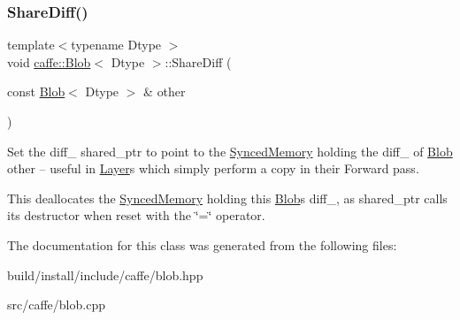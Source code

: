 \subsubsection{\texorpdfstring{Share\+Diff()}{ShareDiff()}\hspace{0.1cm}{\footnotesize\ttfamily [2/2]}}
{\footnotesize\ttfamily template$<$typename Dtype $>$ \\
void \mbox{\hyperlink{classcaffe_1_1_blob}{caffe\+::\+Blob}}$<$ Dtype $>$\+::Share\+Diff (\begin{DoxyParamCaption}\item[{const \mbox{\hyperlink{classcaffe_1_1_blob}{Blob}}$<$ Dtype $>$ \&}]{other }\end{DoxyParamCaption})}



Set the diff\+\_\+ shared\+\_\+ptr to point to the \mbox{\hyperlink{classcaffe_1_1_synced_memory}{Synced\+Memory}} holding the diff\+\_\+ of \mbox{\hyperlink{classcaffe_1_1_blob}{Blob}} other -- useful in \mbox{\hyperlink{classcaffe_1_1_layer}{Layer}}s which simply perform a copy in their Forward pass. 

This deallocates the \mbox{\hyperlink{classcaffe_1_1_synced_memory}{Synced\+Memory}} holding this \mbox{\hyperlink{classcaffe_1_1_blob}{Blob}}\textquotesingle{}s diff\+\_\+, as shared\+\_\+ptr calls its destructor when reset with the \char`\"{}=\char`\"{} operator. 

The documentation for this class was generated from the following files\+:\begin{DoxyCompactItemize}
\item 
build/install/include/caffe/blob.\+hpp\item 
src/caffe/blob.\+cpp\end{DoxyCompactItemize}
